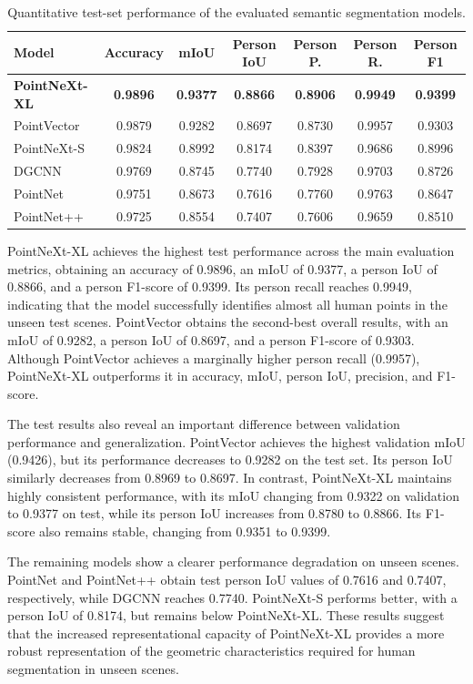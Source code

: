 \begin{table}[ht]
\centering
\caption{Quantitative test-set performance of the evaluated semantic segmentation models.}
\label{tab3}
\begin{tabular}{lcccccc}
\hline
Model & Accuracy & mIoU & Person IoU & Person P. & Person R. & Person F1 \\
\hline
\textbf{PointNeXt-XL} & \textbf{0.9896} & \textbf{0.9377} & \textbf{0.8866} & \textbf{0.8906} & \textbf{0.9949} & \textbf{0.9399} \\
PointVector & 0.9879 & 0.9282 & 0.8697 & 0.8730 & 0.9957 & 0.9303 \\
PointNeXt-S & 0.9824 & 0.8992 & 0.8174 & 0.8397 & 0.9686 & 0.8996 \\
DGCNN & 0.9769 & 0.8745 & 0.7740 & 0.7928 & 0.9703 & 0.8726 \\
PointNet & 0.9751 & 0.8673 & 0.7616 & 0.7760 & 0.9763 & 0.8647 \\
PointNet++ & 0.9725 & 0.8554 & 0.7407 & 0.7606 & 0.9659 & 0.8510 \\
\hline
\end{tabular}
\end{table}

PointNeXt-XL achieves the highest test performance across the main evaluation metrics, obtaining an accuracy of 0.9896, an mIoU of 0.9377, a person IoU of 0.8866, and a person F1-score of 0.9399. Its person recall reaches 0.9949, indicating that the model successfully identifies almost all human points in the unseen test scenes. PointVector obtains the second-best overall results, with an mIoU of 0.9282, a person IoU of 0.8697, and a person F1-score of 0.9303. Although PointVector achieves a marginally higher person recall (0.9957), PointNeXt-XL outperforms it in accuracy, mIoU, person IoU, precision, and F1-score.

The test results also reveal an important difference between validation performance and generalization. PointVector achieves the highest validation mIoU (0.9426), but its performance decreases to 0.9282 on the test set. Its person IoU similarly decreases from 0.8969 to 0.8697. In contrast, PointNeXt-XL maintains highly consistent performance, with its mIoU changing from 0.9322 on validation to 0.9377 on test, while its person IoU increases from 0.8780 to 0.8866. Its F1-score also remains stable, changing from 0.9351 to 0.9399.

The remaining models show a clearer performance degradation on unseen scenes. PointNet and PointNet++ obtain test person IoU values of 0.7616 and 0.7407, respectively, while DGCNN reaches 0.7740. PointNeXt-S performs better, with a person IoU of 0.8174, but remains below PointNeXt-XL. These results suggest that the increased representational capacity of PointNeXt-XL provides a more robust representation of the geometric characteristics required for human segmentation in unseen scenes.

